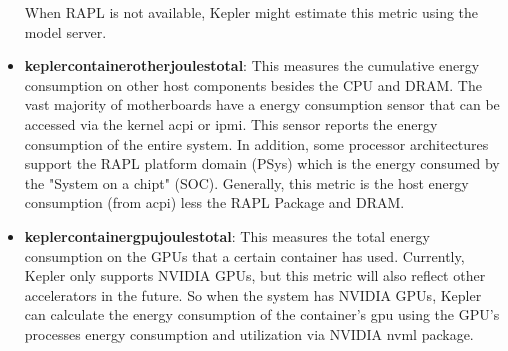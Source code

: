 \begin{itemize}
    When RAPL is not available, Kepler might estimate this metric using the model server.
    \item \textbf{kepler\textunderscore container\textunderscore other\textunderscore joules\textunderscore total}: This measures the cumulative energy consumption on other host components besides the CPU and DRAM. The vast majority of motherboards have a energy consumption sensor that can be accessed via the kernel acpi or ipmi. This sensor reports the energy consumption of the entire system. In addition, some processor architectures support the RAPL platform domain (PSys) which is the energy consumed by the "System on a chipt" (SOC).
    Generally, this metric is the host energy consumption (from acpi) less the RAPL Package and DRAM.
    \item \textbf{kepler\textunderscore container\textunderscore gpu\textunderscore joules\textunderscore total}: This measures the total energy consumption on the GPUs that a certain container has used. Currently, Kepler only supports NVIDIA GPUs, but this metric will also reflect other accelerators in the future. So when the system has NVIDIA GPUs, Kepler can calculate the energy consumption of the container's gpu using the GPU's processes energy consumption and utilization via NVIDIA nvml package.
\end{itemize}

